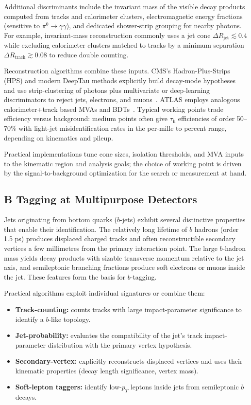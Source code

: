 Additional discriminants include the invariant mass of the visible decay products computed from tracks and calorimeter clusters, electromagnetic energy fractions (sensitive to $\pi^0\to\gamma\gamma$), and dedicated shower-strip grouping for nearby photons. For example, invariant-mass reconstruction commonly uses a jet cone $\Delta R_{\text{jet}}\lesssim0.4$ while excluding calorimeter clusters matched to tracks by a minimum separation $\Delta R_{\text{track}}\gtrsim0.08$ to reduce double counting.

Reconstruction algorithms combine these inputs. CMS's Hadron-Plus-Strips (HPS) and modern DeepTau methods explicitly build decay-mode hypotheses and use strip-clustering of photons plus multivariate or deep-learning discriminators to reject jets, electrons, and muons~\parencite{CMS:2022ydz,CMS_DeepTau}. ATLAS employs analogous calorimeter+track based MVAs and BDTs~\parencite{ATLAS:2022fgo}. Typical working points trade efficiency versus background: medium points often give $\tau_{\mathrm{h}}$ efficiencies of order 50–70\% with light-jet misidentification rates in the per-mille to percent range, depending on kinematics and pileup.

Practical implementations tune cone sizes, isolation thresholds, and MVA inputs to the kinematic region and analysis goals; the choice of working point is driven by the signal-to-background optimization for the search or measurement at hand.

\subsection{B Tagging at Multipurpose Detectors}

Jets originating from bottom quarks ($b$-jets) exhibit several distinctive properties that enable their identification. The relatively long lifetime of $b$ hadrons (order 1.5 ps) produces displaced charged tracks and often reconstructible secondary vertices a few millimetres from the primary interaction point. The large $b$-hadron mass yields decay products with sizable transverse momentum relative to the jet axis, and semileptonic branching fractions produce soft electrons or muons inside the jet. These features form the basis for $b$-tagging.

Practical algorithms exploit individual signatures or combine them:
\begin{itemize}
  \item \textbf{Track-counting:} counts tracks with large impact-parameter significance to identify a $b$-like topology.
  \item \textbf{Jet-probability:} evaluates the compatibility of the jet's track impact-parameter distribution with the primary vertex hypothesis.
  \item \textbf{Secondary-vertex:} explicitly reconstructs displaced vertices and uses their kinematic properties (decay length significance, vertex mass).
  \item \textbf{Soft-lepton taggers:} identify low-$p_T$ leptons inside jets from semileptonic $b$ decays.
\end{itemize}

